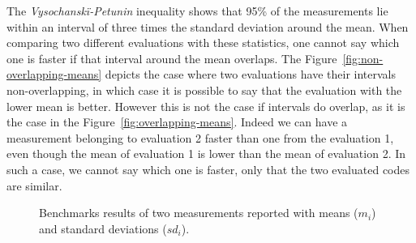 The \emph{Vysochansk\"i-Petunin} inequality shows that 95\% of the measurements
lie within an interval of three times the standard deviation around the mean.
When comparing two different evaluations with these statistics, one cannot say
which one is faster if that interval around the mean overlaps. The
Figure~\ref{fig:non-overlapping-means} depicts the case where two evaluations
have their intervals non-overlapping, in which case it is possible to say that
the evaluation with the lower mean is better. However this is not the case if
intervals do overlap, as it is the case in the
Figure~\ref{fig:overlapping-means}. Indeed we can have a measurement belonging
to evaluation 2 faster than one from the evaluation 1, even though the mean of
evaluation 1 is lower than the mean of evaluation 2. In such a case, we cannot
say which one is faster, only that the two evaluated codes are similar.

\begin{figure}
%
\caption{Benchmarks results of two measurements reported with means ($m_i$) and
standard deviations ($sd_i$).}
\end{figure}

